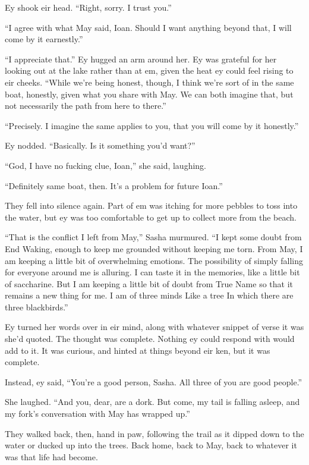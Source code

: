 Ey shook eir head. ``Right, sorry. I trust you.''

``I agree with what May said, Ioan. Should I want anything beyond that, I will come by it earnestly.''

``I appreciate that.'' Ey hugged an arm around her. Ey was grateful for her looking out at the lake rather than at em, given the heat ey could feel rising to eir cheeks. ``While we're being honest, though, I think we're sort of in the same boat, honestly, given what you share with May. We can both imagine that, but not necessarily the path from here to there.''

``Precisely. I imagine the same applies to you, that you will come by it honestly.''

Ey nodded. ``Basically. Is it something you'd want?''

``God, I have no fucking clue, Ioan,'' she said, laughing.

``Definitely same boat, then. It's a problem for future Ioan.''

They fell into silence again. Part of em was itching for more pebbles to toss into the water, but ey was too comfortable to get up to collect more from the beach.

``That is the conflict I left from May,'' Sasha murmured. ``I kept some doubt from End Waking, enough to keep me grounded without keeping me torn. From May, I am keeping a little bit of overwhelming emotions. The possibility of simply falling for everyone around me is alluring. I can taste it in the memories, like a little bit of saccharine. But I am keeping a little bit of doubt from True Name so that it remains a new thing for me. I am of three minds Like a tree In which there are three blackbirds.''

Ey turned her words over in eir mind, along with whatever snippet of verse it was she'd quoted. The thought was complete. Nothing ey could respond with would add to it. It was curious, and hinted at things beyond eir ken, but it was complete.

Instead, ey said, ``You're a good person, Sasha. All three of you are good people.''

She laughed. ``And you, dear, are a dork. But come, my tail is falling asleep, and my fork's conversation with May has wrapped up.''

They walked back, then, hand in paw, following the trail as it dipped down to the water or ducked up into the trees. Back home, back to May, back to whatever it was that life had become.

